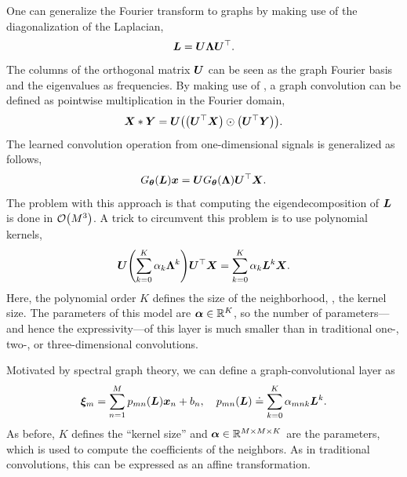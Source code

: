 One can generalize the Fourier transform to graphs by making use of the diagonalization of the
Laplacian, \[
    \bm{L} = \bm{U} \bm{\Lambda} \bm{U}^\top.
\]
The columns of the orthogonal matrix $\bm{U}$ can be seen as the graph Fourier basis and the
eigenvalues as frequencies. By making use of , a graph convolution can be
defined as pointwise multiplication in the Fourier domain, \[
    \mat{X} * \mat{Y} = \mat{U} \lft(\lft( \transpose{\mat{U}} \mat{X} \rgt) \odot \lft( \transpose{\mat{U}} \mat{Y} \rgt)\rgt).
\]
The learned convolution operation from one-dimensional signals is generalized as follows, \[
    G_{\bm{\theta}}(\bm{L})\bm{x} = \bm{U}G_{\bm{\theta}}(\bm{\Lambda}) \bm{U}^\top\bm{X}.
\]
The problem with this approach is that computing the eigendecomposition of $\bm{L}$ is done in
$\bigo{M^3}$. A trick to circumvent this problem is to use polynomial kernels, \[
    \mat{U} \lft( \sum_{k=0}^{K} \alpha_k \mat{\Lambda}^k \rgt) \transpose{\mat{U}} \mat{X} = \sum_{k=0}^{K} \alpha_k \mat{L}^k \mat{X}.
\]
Here, the polynomial order $K$ defines the size of the neighborhood, \ie, the kernel size. The
parameters of this model are $\bm{\alpha} \in \mathbb{R}^K$, so the number of parameters---and hence the
expressivity---of this layer is much smaller than in traditional one-, two-, or three-dimensional
convolutions.

Motivated by spectral graph theory, we can define a graph-convolutional layer as \[
    \bm{\xi}_m = \sum_{n=1}^{M} p_{mn}(\bm{L}) \bm{x}_n + b_n, \quad p_{mn}(\bm{L}) \doteq \sum_{k=0}^{K} \alpha_{mnk} \bm{L}^k.
\]
As before, $K$ defines the ``kernel size'' and $\bm{\alpha} \in \mathbb{R}^{M \times M \times K}$ are the
parameters, which is used to compute the coefficients of the neighbors. As in traditional
convolutions, this can be expressed as an affine transformation.
